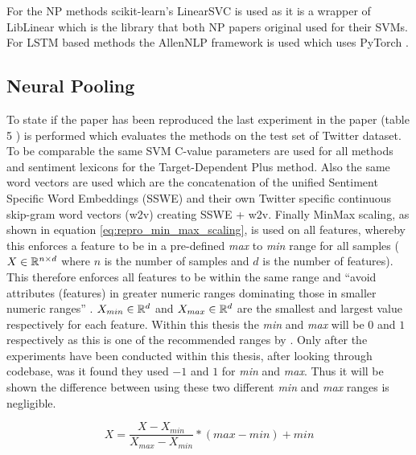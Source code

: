 For the NP methods scikit-learn's \citep{pedregosa2011scikit} LinearSVC is used as it is a wrapper of LibLinear \citep{fan2008liblinear} which is the library that both NP papers original used for their SVMs. For \citet{tang-etal-2016-effective} LSTM based methods the AllenNLP framework \citep{gardner-etal-2018-allennlp} is used which uses PyTorch \citep{NEURIPS2019_9015}. 



\subsection{Neural Pooling}
\label{section:repro_neural_pooling}
To state if the paper \citep{vo2015target} has been reproduced the last experiment in the paper (table 5 \citep{vo2015target}) is performed which evaluates the methods on the test set of \citet{dong-etal-2014-adaptive} Twitter dataset. To be comparable the same SVM C-value parameters are used for all methods and sentiment lexicons for the Target-Dependent Plus method. Also the same word vectors are used which are the concatenation of the unified Sentiment Specific Word Embeddings (SSWE) \citep{tang-etal-2014-learning} and their own Twitter specific continuous skip-gram \citep{mikolov2013efficient} word vectors (w2v) creating SSWE + w2v. Finally MinMax scaling, as shown in equation \ref{eq:repro_min_max_scaling}, is used on all features, whereby this enforces a feature to be in a pre-defined \textit{max} to \textit{min} range for all samples ($X \in \mathbb{R}^{n \times d}$ where $n$ is the number of samples and $d$ is the number of features). This therefore enforces all features to be within the same range and ``avoid attributes (features) in greater numeric ranges dominating those in smaller numeric ranges'' \citep{hsu2003practical}. $X_{min} \in \mathbb{R}^d$ and $X_{max} \in \mathbb{R}^d$ are the smallest and largest value respectively for each feature. Within this thesis the \textit{min} and \textit{max} will be $0$ and $1$ respectively as this is one of the recommended ranges by \citet{hsu2003practical}. Only after the experiments have been conducted within this thesis, after looking through \citet{wang-etal-2017-tdparse} codebase, was it found they used $-1$ and $1$ for \textit{min} and \textit{max}. Thus it will be shown the difference between using these two different \textit{min} and \textit{max} ranges is negligible.

\begin{equation}
    X = \frac{X - X_{min}}{X_{max} - X_{min}} * (max - min) + min
    \label{eq:repro_min_max_scaling}
\end{equation}

